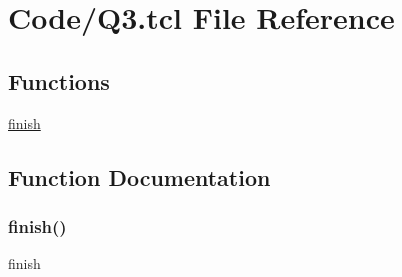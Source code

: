 \hypertarget{Q3_8tcl}{}\section{Code/\+Q3.tcl File Reference}
\label{Q3_8tcl}
\subsection*{Functions}
\begin{DoxyCompactItemize}
\item 
\mbox{\hyperlink{Q3_8tcl_a30728837c246b65ef76298af0101d99c}{finish}}
\end{DoxyCompactItemize}


\subsection{Function Documentation}
\mbox{\label{Q3_8tcl_a30728837c246b65ef76298af0101d99c}} 
\subsubsection{\texorpdfstring{finish()}{finish()}}
{\footnotesize\ttfamily finish}

